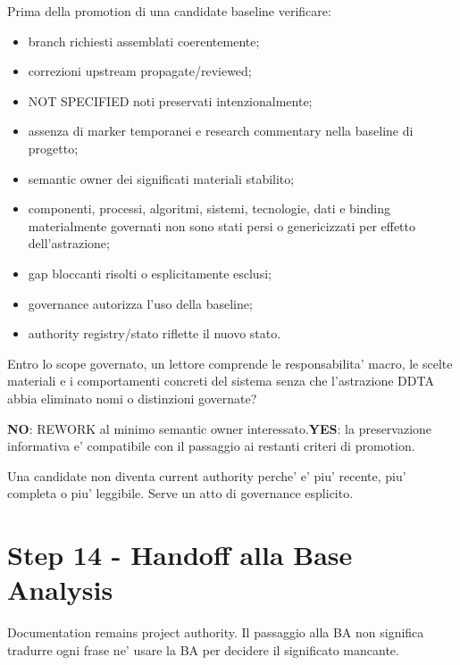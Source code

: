 \documentclass[11pt,a4paper]{article}
\begin{document}
Prima della promotion di una candidate baseline verificare:
\begin{itemize}
  \item branch richiesti assemblati coerentemente;
  \item correzioni upstream propagate/reviewed;
  \item NOT SPECIFIED noti preservati intenzionalmente;
  \item assenza di marker temporanei e research commentary nella baseline di progetto;
  \item semantic owner dei significati materiali stabilito;
  \item componenti, processi, algoritmi, sistemi, tecnologie, dati e binding materialmente governati non sono stati persi o genericizzati per effetto dell'astrazione;
  \item gap bloccanti risolti o esplicitamente esclusi;
  \item governance autorizza l'uso della baseline;
  \item authority registry/stato riflette il nuovo stato.
\end{itemize}

\begin{ddtacheck}[title={A12 - native documentation completeness}]
Entro lo scope governato, un lettore comprende le responsabilita' macro, le scelte materiali e i comportamenti concreti del sistema senza che l'astrazione DDTA abbia eliminato nomi o distinzioni governate?\par
\textbf{NO}: REWORK al minimo semantic owner interessato.\quad \textbf{YES}: la preservazione informativa e' compatibile con il passaggio ai restanti criteri di promotion.
\end{ddtacheck}

\begin{ddtacore}[title={Promotion non e' recency}]
Una candidate non diventa current authority perche' e' piu' recente, piu' completa o piu' leggibile. Serve un atto di governance esplicito.
\end{ddtacore}

\section{Step 14 - Handoff alla Base Analysis}
\closedtag

Documentation remains project authority. Il passaggio alla BA non significa tradurre ogni frase ne' usare la BA per decidere il significato mancante.
\end{document}
